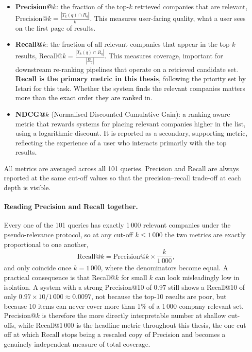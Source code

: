 \documentclass[a4paper,oneside,bibliography=totoc]{scrbook}
\begin{document}
\begin{itemize}
\item \textbf{Precision@$k$}: the fraction of the top-$k$ retrieved companies that are relevant, $\text{Precision@}k = \frac{|T_k(q) \cap R_q|}{k}$. This measures user-facing quality, what a user sees on the first page of results.

\item \textbf{Recall@$k$}: the fraction of all relevant companies that appear in the top-$k$ results, $\text{Recall@}k = \frac{|T_k(q) \cap R_q|}{|R_q|}$. This measures coverage, important for downstream re-ranking pipelines that operate on a retrieved candidate set. \textbf{Recall is the primary metric in this thesis}, following the priority set by Istari for this task. Whether the system finds the relevant companies matters more than the exact order they are ranked in.

\item \textbf{NDCG@$k$} (Normalised Discounted Cumulative Gain): a ranking-aware metric that rewards systems for placing relevant companies higher in the list, using a logarithmic discount. It is reported as a secondary, supporting metric, reflecting the experience of a user who interacts primarily with the top results.
\end{itemize}

All metrics are averaged across all 101 queries. Precision and Recall are always reported at the same cut-off values so that the precision--recall trade-off at each depth is visible.

\paragraph{Reading Precision and Recall together.} Every one of the 101 queries has exactly 1\,000 relevant companies under the pseudo-relevance protocol, so at any cut-off $k \le 1\,000$ the two metrics are exactly proportional to one another, \[ \text{Recall@}k = \text{Precision@}k \times \frac{k}{1\,000}, \] and only coincide once $k = 1\,000$, where the denominators become equal. A practical consequence is that Recall@$k$ for small $k$ can look misleadingly low in isolation. A system with a strong Precision@10 of 0.97 still shows a Recall@10 of only $0.97 \times 10/1\,000 \approx 0.0097$, not because the top-10 results are poor, but because 10 items can never cover more than 1\% of a 1\,000-company relevant set. Precision@$k$ is therefore the more directly interpretable number at shallow cut-offs, while Recall@1\,000 is the headline metric throughout this thesis, the one cut-off at which Recall stops being a rescaled copy of Precision and becomes a genuinely independent measure of total coverage.
\end{document}
